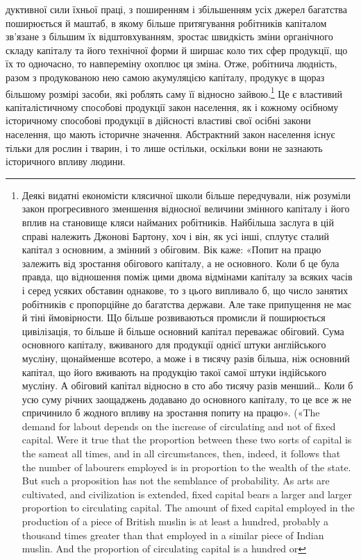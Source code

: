 \parcont{}  %
дуктивної сили їхньої праці, з поширенням і збільшенням усіх
джерел багатства поширюється й маштаб, в якому більше притягування
робітників капіталом зв’язане з більшим їх відштовхуванням,
зростає швидкість зміни органічного складу капіталу
та його технічної форми й ширшає коло тих сфер продукції, що
їх то одночасно, то навпереміну охоплює ця зміна. Отже, робітнича
людність, разом з продукованою нею самою акумуляцією
капіталу, продукує в щораз більшому розмірі засоби, які роблять
саму її відносно зайвою.\footnote{
Деякі видатні економісти клясичної школи більше передчували,
ніж розуміли закон прогресивного зменшення відносної величини змінного
капіталу і його вплив на становище кляси найманих робітників.
Найбільша заслуга в цій справі належить Джонові Бартону, хоч і він, як
усі інші, сплутує сталий капітал з основним, а змінний з обіговим. Вік
каже: «Попит на працю залежить від зростання обігового капіталу, а
не основного. Коли б це була правда, що відношення поміж цими двома
відмінами капіталу за всяких часів і серед усяких обставин однакове,
то з цього випливало б, що число занятих робітників є пропорційне до
багатства держави. Але таке припущення не має й тіні ймовірности. Що
більше розвиваються промисли й поширюється цивілізація, то більше
й більше основний капітал переважає обіговий. Сума основного капіталу,
вживаного для продукції однієї штуки англійського мусліну, щонайменше
всотеро, а може і в тисячу разів більша, ніж основний капітал, що його
вживають на продукцію такої самої штуки індійського мусліну. А обіговий
капітал відносно в сто або тисячу разів менший\dots{} Коли б усю суму річних
заощаджень додавано до основного капіталу, то це все ж не спричинило
б жодного впливу на зростання попиту на працю». («The demand for
labout depends on the increase of circulating and not of fixed capital. Were
it true that the proportion between these two sorts of capital is the sameat
all times, and in all circumstances, then, indeed, it follows that the number
of labourers employed is in proportion to the wealth of the state.
But such a proposition has not the semblance of probability. As arts are
cultivated, and civilization is extended, fixed capital bears a larger and
larger proportion to circulating capital. The amount of fixed capital employed
in the production of a piece of British muslin is at least a hundred, probably
a thousand times greater than that employed in a similar piece of
Indian muslin. And the proportion of circulating capital is a hundred or
} Це є властивий капіталістичному
способові продукції закон населення, як і кожному осібному
історичному способові продукції в дійсності властиві свої осібні
закони населення, що мають історичне значення. Абстрактний
закон населення існує тільки для рослин і тварин, і то лише
остільки, оскільки вони не зазнають історичного впливу людини.

